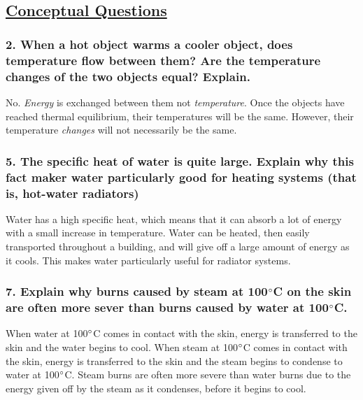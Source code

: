 \documentclass{article}
\title{
    \vspace{2in}
    \textmd{\textbf{\hmwkTitle}}\\
    \vspace{0.5in}
    \textmd{\textbf{\hmwkClass}}\\
    \vspace{4in}
}
\author{\hmwkAuthorName}
\date{}
\begin{document}
\maketitle
\begin{center}
    \section*{\textbf{\underline {Conceptual Questions}}}
\end{center}

\subsubsection*{
    2. When a hot object warms a cooler object, does temperature flow between them?
    Are the temperature changes of the two objects equal? Explain.
}
No. \textit{Energy} is exchanged between them not \textit {temperature}. Once the objects
have reached thermal equilibrium, their temperatures will be the same.
However, their temperature \textit{changes} will not necessarily be the same.
\subsubsection*{
    5. The specific heat of water is quite large. Explain why this fact maker
    water particularly good for heating systems (that is, hot-water radiators)
}
Water has a high specific heat, which means that it can absorb a lot of energy with a
small increase in temperature. Water can be heated, then easily transported throughout
a building, and will give off a large amount of energy as it cools. This makes water
particularly useful for radiator systems.
\subsubsection*{
    7. Explain why burns caused by steam at 100$\degree$C on the skin are
    often more sever than burns caused by water at 100$\degree$C.
}
When water at 100$\degree$C comes in contact with the skin, energy is transferred to the
skin and the water begins to cool. When steam at 100$\degree$C comes in contact with the
skin, energy is transferred to the skin and the steam begins to condense to water at
100$\degree$C. Steam burns are often more severe than water burns due to the energy
given off by the steam as it condenses, before it begins to cool.
\end{document}
